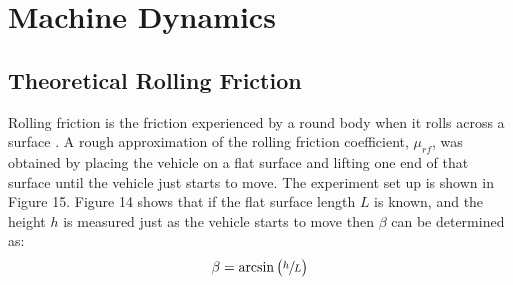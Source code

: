 \documentclass[a4paper]{article}
\begin{document}
\clearpage

\section{Machine Dynamics}
\subsection{Theoretical Rolling Friction}

Rolling friction is the friction experienced by a round body when it rolls across a surface \cite{Giancoli:2000}. A rough approximation of the rolling friction coefficient, $\mu_{rf}$, was obtained by placing the vehicle on a flat surface and lifting one end of that surface until the vehicle just starts to move. The experiment set up is shown in Figure 15. Figure 14 shows that if the flat surface length $L$ is known, and the height $h$ is measured just as the vehicle starts to move then $\beta$ can be determined as:
\begin{equation}
	\beta = \arcsin \big( \sfrac{h}{L} \big)
\end{equation}
\end{document}
